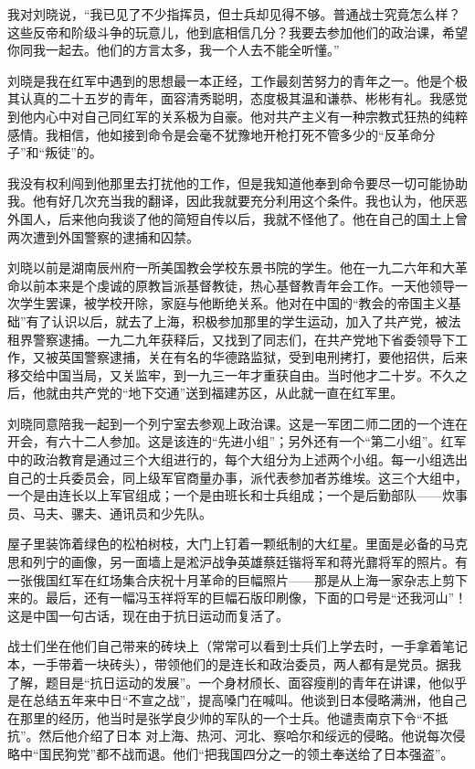 \documentclass[10pt]{book}
\begin{document}
我对刘晓说，“我已见了不少指挥员，但士兵却见得不够。普通战士究竟怎么样？这些反帝和阶级斗争的玩意儿，他到底相信几分？我要去参加他们的政治课，希望你同我一起去。他们的方言太多，我一个人去不能全听懂。”

刘晓是我在红军中遇到的思想最一本正经，工作最刻苦努力的青年之一。他是个极其认真的二十五岁的青年，面容清秀聪明，态度极其温和谦恭、彬彬有礼。我感觉到他内心中对自己同红军的关系极为自豪。他对共产主义有一种宗教式狂热的纯粹感情。我相信，他如接到命令是会毫不犹豫地开枪打死不管多少的“反革命分子”和“叛徒”的。

我没有权利闯到他那里去打扰他的工作，但是我知道他奉到命令要尽一切可能协助我。他有好几次充当我的翻译，因此我就要充分利用这个条件。我也认为，他厌恶外国人，后来他向我谈了他的简短自传以后，我就不怪他了。他在自己的国土上曾两次遭到外国警察的逮捕和囚禁。

刘晓以前是湖南辰州府一所美国教会学校东景书院的学生。他在一九二六年和大革命以前本来是个虔诚的原教旨派基督教徒，热心基督教青年会工作。一天他领导一次学生罢课，被学校开除，家庭与他断绝关系。他对在中国的“教会的帝国主义基础”有了认识以后，就去了上海，积极参加那里的学生运动，加入了共产党，被法租界警察逮捕。一九二九年获释后，又找到了同志们，在共产党地下省委领导下工作，又被英国警察逮捕，关在有名的华德路监狱，受到电刑拷打，要他招供，后来移交给中国当局，又关监牢，到一九三一年才重获自由。当时他才二十岁。不久之后，他就由共产党的“地下交通”送到福建苏区，从此就一直在红军里。

刘晓同意陪我一起到一个列宁室去参观上政治课。这是一军团二师二团的一个连在开会，有六十二人参加。这是该连的“先进小组”；另外还有一个“第二小组”。红军中的政治教育是通过三个大组进行的，每个大组分为上述两个小组。每一小组选出自己的士兵委员会，同上级军官商量办事，派代表参加者苏维埃。这三个大组中，一个是由连长以上军官组成；一个是由班长和士兵组成；一个是后勤部队——炊事员、马夫、骡夫、通讯员和少先队。

屋子里装饰着绿色的松柏树枝，大门上钉着一颗纸制的大红星。里面是必备的马克思和列宁的画像，另一面墙上是淞沪战争英雄蔡廷锴将军和蒋光鼐将军的照片。有一张俄国红军在红场集合庆祝十月革命的巨幅照片——那是从上海一家杂志上剪下来的。最后，还有一幅冯玉祥将军的巨幅石版印刷像，下面的口号是“还我河山”！这是中国一句古话，现在由于抗日运动而复活了。

战士们坐在他们自己带来的砖块上（常常可以看到士兵们上学去时，一手拿着笔记本，一手带着一块砖头），带领他们的是连长和政治委员，两人都有是党员。据我了解，题目是“抗日运动的发展”。一个身材颀长、面容瘦削的青年在讲课，他似乎是在总结五年来中日“不宣之战”，提高嗓门在喊叫。他谈到日本侵略满洲，他自己在那里的经历，他当时是张学良少帅的军队的一个士兵。他谴责南京下令“不抵抗”。然后他介绍了日本 对上海、热河、河北、察哈尔和绥远的侵略。他说每次侵略中“国民狗党”都不战而退。他们“把我国四分之一的领土奉送给了日本强盗”。
\end{document}
